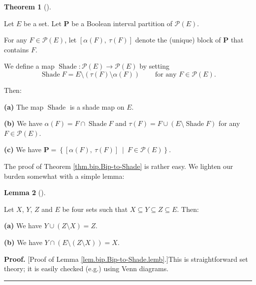 \documentclass[numbers=enddot,12pt,final,onecolumn]{scrartcl}%
\theoremstyle{definition}
\newtheorem{theo}{Theorem}[section]
\newenvironment{theorem}[1][]
{\begin{theo}[#1]\begin{leftbar}}
{\end{leftbar}\end{theo}}
\newtheorem{lem}[theo]{Lemma}
\newenvironment{lemma}[1][]
{\begin{lem}[#1]\begin{leftbar}}
{\end{leftbar}\end{lem}}
\newenvironment{proof}[1][Proof]{\noindent\textbf{#1.} }{\ \rule{0.5em}{0.5em}}
\begin{document}
\begin{theorem}
\label{thm.bip.Bip-to-Shade}Let $E$ be a set. Let $\mathbf{P}$ be a Boolean
interval partition of $\mathcal{P}\left(  E\right)  $.

For any $F\in\mathcal{P}\left(  E\right)  $, let $\left[  \alpha\left(
F\right)  ,\ \tau\left(  F\right)  \right]  $ denote the (unique) block of
$\mathbf{P}$ that contains $F$.

We define a map $\operatorname*{Shade}:\mathcal{P}\left(  E\right)
\rightarrow\mathcal{P}\left(  E\right)  $ by setting%
\[
\operatorname*{Shade}F=E\setminus\left(  \tau\left(  F\right)  \setminus
\alpha\left(  F\right)  \right)  \ \ \ \ \ \ \ \ \ \ \text{for any }%
F\in\mathcal{P}\left(  E\right)  .
\]


Then:

\textbf{(a)} The map $\operatorname*{Shade}$ is a shade map on $E$.

\textbf{(b)} We have $\alpha\left(  F\right)  =F\cap\operatorname*{Shade}F$
and $\tau\left(  F\right)  =F\cup\left(  E\setminus\operatorname*{Shade}%
F\right)  $ for any $F\in\mathcal{P}\left(  E\right)  $.

\textbf{(c)} We have $\mathbf{P}=\left\{  \left[  \alpha\left(  F\right)
,\ \tau\left(  F\right)  \right]  \ \mid\ F\in\mathcal{P}\left(  E\right)
\right\}  $.
\end{theorem}

The proof of Theorem \ref{thm.bip.Bip-to-Shade} is rather easy. We lighten our
burden somewhat with a simple lemma:

\begin{lemma}
\label{lem.bip.Bip-to-Shade.lemb}Let $X$, $Y$, $Z$ and $E$ be four sets such
that $X\subseteq Y\subseteq Z\subseteq E$. Then:

\textbf{(a)} We have $Y\cup\left(  Z\setminus X\right)  =Z$.

\textbf{(b)} We have $Y\cap\left(  E\setminus\left(  Z\setminus X\right)
\right)  =X$.
\end{lemma}

\begin{proof}
[Proof of Lemma \ref{lem.bip.Bip-to-Shade.lemb}.]This is straightforward set
theory; it is easily checked (e.g.) using Venn diagrams.
\end{proof}
\end{document}
